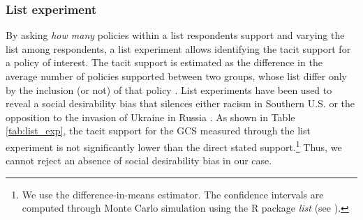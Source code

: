 \subsubsection{List experiment}\label{subsubsec:list_exp}  %

By asking \textit{how many} policies within a list respondents support and varying the list among respondents, a list experiment allows identifying the tacit support for a policy of interest. The tacit support is estimated as the difference in the average number of policies supported between two groups, whose list differ only by the inclusion (or not) of that policy \citep{hainmueller_causal_2014}. %
List experiments have been used to reveal a social desirability bias that silences either racism in Southern U.S. \citep{kuklinski_racial_1997} or the opposition to the invasion of Ukraine in Russia \citep{chapkovski_solid_2022}. %
As shown in Table \ref{tab:list_exp}, the tacit support for the GCS measured through the list experiment is not significantly lower than the direct stated support.\footnote{We use the difference-in-means estimator. The confidence intervals are computed through Monte Carlo simulation using the R package \textit{list} (see \citealp{imai_multivariate_2011}).} Thus, we cannot reject an absence of social desirability bias in our case.

